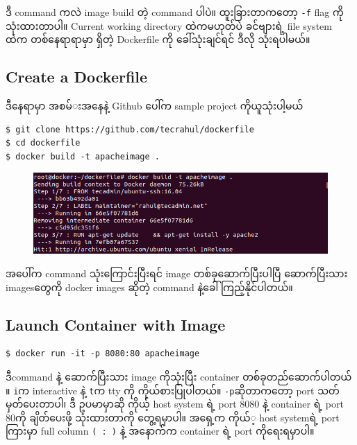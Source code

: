 \documentclass{article}
\begin{document}
ဒီ command ကလဲ image build တဲ့ command ပါပဲ။ ထူးခြားတာက​တော့ \texttt{-f}
flag ကိုသုံးထားတာပါ။ Current working directory ထဲကမဟုတ်​ပဲ ခင်​​ဗျားရဲ့
file system ထဲက တစ်​​နေရာရာမှာ ရှိတဲ့ Dockerfile ကို ​ခေါ်သုံးချင်​ရင်​
ဒီလို သုံးရပါမယ်​။

\subsection{Create a Dockerfile}\label{create-a-dockerfile}

ဒီ​နေရာမှာ အစမ်​း​အ​နေနဲ့ Github ​ပေါ်က sample project ကိုယူသုံးပါ့မယ်​

\begin{verbatim}
$ git clone https://github.com/tecrahul/dockerfile 
$ cd dockerfile
$ docker build -t apacheimage .
\end{verbatim}

\begin{figure}[htbp]
\centering
\includegraphics[width=0.70\paperwidth]{.gitbook/assets/3c_apacheimage_build.png}
\end{figure}

အ​ပေါ်က command သုံး​ကြောင်းပြီးရင်​ image တစ်​ခု​ဆောက်​ပြီးပါပြီ
​ဆောက်​ပြီးသား images ​တွေကို docker images ဆိုတဲ့ command
နဲ့​ခေါ်ကြည့်နိုင်​ပါတယ်​။

\subsection{Launch Container with
Image}\label{launch-container-with-image}

\begin{verbatim}
$ docker run -it -p 8080:80 apacheimage
\end{verbatim}

ဒီcommand နဲ့ ​ဆောက်​ပြီးသား image ကိုသုံးပြီး container
တစ်​ခုတည်​​ဆောက်​ပါတယ်​။ \texttt{i}က interactive နဲ့ \texttt{t}က tty ကို
ကိုယ်​စားပြုပါတယ်​။ \texttt{-p}ဆိုတာက​တော့ port သတ်​မှတ်​​ပေးတာပါ၊ ဒီ
ဥပမာမှာဆို ကိုယ့် host system ရဲ့ port 8080 နဲ့ container ရဲ့ port 80ကို
ချိတ်​​ပေးဖို့ သုံးထားတာကို ​တွေ့ရမှာပါ။ အ​ရှေ့က ကိုယ်​့ host systemရဲ့
port ကြားမှာ full column \texttt{( : )} နဲ့ အ​နောက်​က container ရဲ့ port
ကို​ရေးရမှာပါ။
\end{document}
